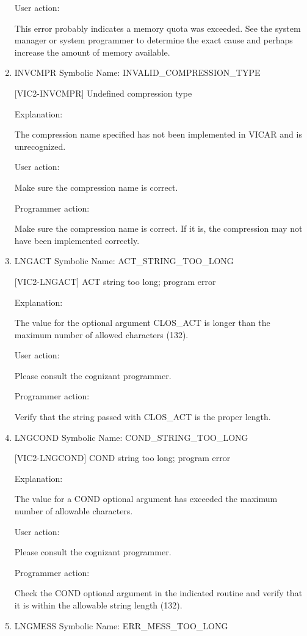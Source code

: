 \begin{enumerate}
User action:

This error probably indicates a memory quota was exceeded.
See the system manager or system programmer to determine the
exact cause and perhaps increase the amount of memory available.


\item INVCMPR Symbolic Name: INVALID\_COMPRESSION\_TYPE

[VIC2-INVCMPR] Undefined compression type

Explanation:

The compression name specified has not been implemented in VICAR
and is unrecognized.

User action:

Make sure the compression name is correct.

Programmer action:

Make sure the compression name is correct.  If it is, the compression
may not have been implemented correctly.


\item LNGACT Symbolic Name: ACT\_STRING\_TOO\_LONG

[VIC2-LNGACT] ACT string too long; program error

Explanation:

The value for the optional argument CLOS\_ACT is longer than
the maximum number of allowed characters (132).

User action:

Please consult the cognizant programmer.

Programmer action:

Verify that the string passed with CLOS\_ACT is the proper length.


\item LNGCOND Symbolic Name: COND\_STRING\_TOO\_LONG

[VIC2-LNGCOND] COND string too long; program error

Explanation:

The value for a COND optional argument has exceeded the maximum
number of allowable characters.

User action:

Please consult the cognizant programmer.

Programmer action:

Check the COND optional argument in the indicated routine
and verify that it is within the allowable string length (132).


\item LNGMESS Symbolic Name: ERR\_MESS\_TOO\_LONG


\end{enumerate}
